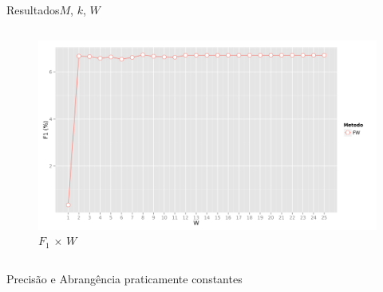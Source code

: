\begin{frame}{Resultados}{$M$, $k$, $W$}
\begin{columns}[b]
\begin{figure}[ht]
    \begin{center}
    \includegraphics[width=1.1\textwidth]{../img/F1_W}
    \end{center}
    \caption{$F_1$ $\times$ $W$}
    \label{fig:F1_W}
\end{figure}
\end{columns}
\begin{center}
    Precisão e Abrangência praticamente constantes
\end{center}
\end{frame}



